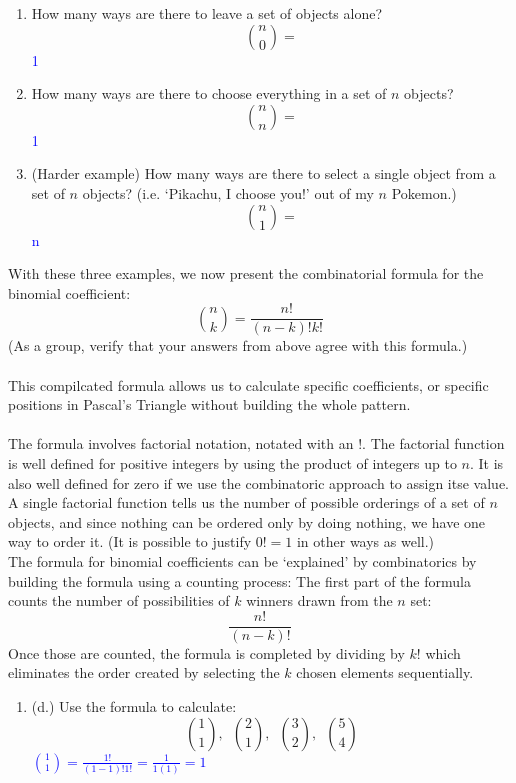 \documentclass{ximera}
\begin{document}
\begin{exercise}
    \begin{enumerate}
        \item How many ways are there to leave a set of objects alone?
        \[{n\choose 0}=\]
        \textcolor{blue}{1}
        \item How many ways are there to choose everything in a set of $n$ objects?
        \[{n \choose n}=\]
        \textcolor{blue}{1}
        \item (Harder example) How many ways are there to select a single object from a set of $n$ objects? (i.e. `Pikachu, I choose you!' out of my $n$ Pokemon.)
        \[{n\choose 1}=\]
        \textcolor{blue}{n}
    \end{enumerate}
    With these three examples, we now present the combinatorial formula for the binomial coefficient:
    \[{n\choose k}=\frac{n!}{(n-k)!k!}\]
    (As a group, verify that your answers from above agree with this formula.)\\
    \\
    This compilcated formula allows us to calculate specific coefficients, or specific positions in Pascal's Triangle without building the whole pattern.\\
    \\
    The formula involves factorial notation, notated with an $!$.  The factorial function is well defined for positive integers by using the product of integers up to $n$.  It is also well defined for zero if we use the combinatoric approach to assign itse value.  A single factorial function tells us the number of possible orderings of a set of $n$ objects, and since nothing can be ordered only by doing nothing, we have one way to order it.  (It is possible to justify $0!=1$ in other ways as well.)\\
    The formula for binomial coefficients can be `explained' by combinatorics by building the formula using a counting process: The first part of the formula counts the number of possibilities of $k$ winners drawn from the $n$ set: 
    \[\frac{n!}{(n-k)!}\]
    Once those are counted, the formula is completed by dividing by $k!$ which eliminates the order created by selecting the $k$ chosen elements sequentially.\\
    \begin{enumerate}
        \item (d.) Use the formula to calculate: 
        \[{1\choose 1}, \,\,\, {2\choose 1}, \,\,\, {3\choose 2}, \,\,\, {5 \choose 4}\]
        \textcolor{blue}{ ${1\choose 1}=\frac{1!}{(1-1)!1!}=\frac{1}{1(1)}=1$\\
}
\end{enumerate}
\end{exercise}
\end{document}
